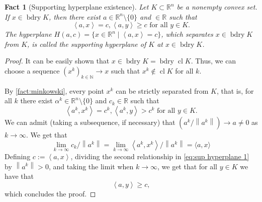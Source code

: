 \documentclass[smallextended,numbook,nospthms]{svjour3}
\theoremstyle{plain}
\newtheorem{fact}[theorem]{Fact}
\theoremstyle{definition}
\def\RR{\mathds R}
\def\NN{\mathds N}
\newcommand{\scal}[2]{\left\langle{#1},{#2}  \right\rangle}
\begin{document}
\begin{fact}[Supporting hyperplane existence]\label{fact:sup hyperplane}
Let $K \subset \RR^{n}$ be a nonempty convex set. If $x \in \operatorname{bdry} K$, then there exist $a \in \RR^{n} \setminus \{0\}$ and $ \in \RR$ such that
\[
\scal{a}{x}=c, \scal{a}{y}\geq c \text{ for all } y \in K.
\]
The hyperplane $H(a,c)=\{x \in \RR^n \mid \scal{a}{x}=c\}$, which separates $x \in \operatorname{bdry} K$ from $K$, is called the \emph{supporting hyperplane} of $K$ at $x \in \operatorname{bdry} K$. 
\end{fact}
\begin{proof}
	It can be easily shown that $x \in \operatorname{bdry} K=\operatorname{bdry} \operatorname{cl} K$. Thus, we can choose a sequence $(x^k)_{k \in \NN} \rightarrow x$ such that $x^{k} \notin \operatorname{cl} K$ for all $k$. 	
	
	By \cref{fact:minkowski}, every point $x^{k}$ can be strictly separated from $K$, that is, for all $k$ there exist $\alpha^k \in \RR^n \setminus \{0\}$ and $c_k \in \RR$ such that
	\[
	\scal{a^{k}}{x^{k}}=c^{k}, \scal{a^{k}}{y}>c^{k} \text{ for all } y \in K. \label{eq:sup hyperplane 1}
	\]
	We can admit (taking a subsequence, if necessary) that $\left (a^{k} /\left\|a^{k}\right\|\right) \rightarrow a \neq 0$ as $k \rightarrow \infty$. We get that
	\[
	\lim _{k \rightarrow \infty} c_{k}/\left\|a^{k}\right\|=\lim _{k \rightarrow \infty}\scal{a^k}{x^k}/\left\|a^{k}\right\|=\langle a, x\rangle
	\]
	Defining $c:=\scal{a}{x}$, dividing the second relationship in \cref{eq:sup hyperplane 1} by $\left\|a^{k}\right\|>0$, and taking the limit when $k \rightarrow \infty$, we get that for all $y \in K$ we have that
	\[
	\scal{a}{y}\geq c,
	\]
	which concludes the proof.
\end{proof}
\end{document}
